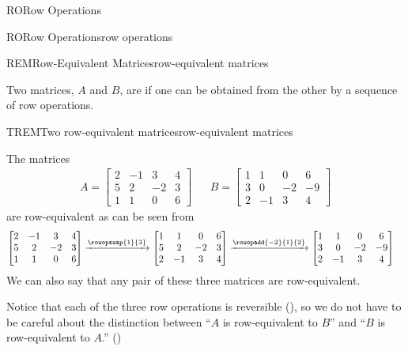 \begin{subsect}{RO}{Row Operations}
\begin{definition}{RO}{Row Operations}{row operations}
\end{definition}
%
\begin{definition}{REM}{Row-Equivalent Matrices}{row-equivalent matrices}
\begin{para}Two matrices, $A$ and $B$, are  if one can be obtained from the other by a sequence of row operations.\end{para}
\end{definition}
%
\begin{example}{TREM}{Two row-equivalent matrices}{row-equivalent matrices}
\begin{para}The matrices
\begin{align*}
A=\begin{bmatrix}
2&-1&3&4\\
5&2&-2&3\\
1&1&0&6
\end{bmatrix}
&&
B=\begin{bmatrix}
1&1&0&6\\
3&0&-2&-9\\
2&-1&3&4
\end{bmatrix}
\end{align*}
are row-equivalent as can be seen from
\begin{align*}
\begin{bmatrix}
2&-1&3&4\\
5&2&-2&3\\
1&1&0&6
\end{bmatrix}
%
\xrightarrow{\rowopswap{1}{3}}
\begin{bmatrix}
1&1&0&6\\
5&2&-2&3\\
2&-1&3&4
\end{bmatrix}
&
%
\xrightarrow{\rowopadd{-2}{1}{2}}
\begin{bmatrix}
1&1&0&6\\
3&0&-2&-9\\
2&-1&3&4
\end{bmatrix}
\end{align*}
We can also say that any pair of these three matrices are row-equivalent.\end{para}
\end{example}
%
\begin{para}Notice that each of the three row operations is reversible (), so we do not have to be careful about the distinction between ``$A$ is row-equivalent to $B$'' and ``$B$ is row-equivalent to $A$.'' ()\end{para}

\end{subsect}
